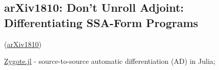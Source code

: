 \subsection{arXiv1810: Don't Unroll Adjoint: Differentiating SSA-Form Programs}
\label{paper:arxiv1810diffZygote}

\cite{innes2018diffZygote}(\href{https://arxiv.org/abs/1810.07951}{arXiv1810})

\href{https://github.com/FluxML/Zygote.jl}{Zygote.jl} - source-to-source automatic differentiation (AD) in Julia;